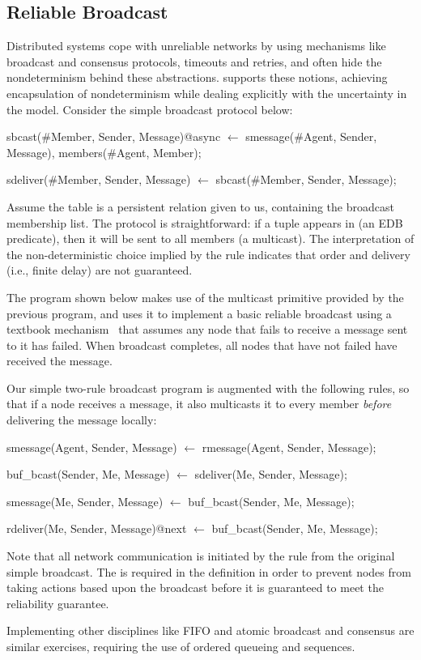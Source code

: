 \subsection{Reliable Broadcast}
Distributed systems cope with unreliable networks by using mechanisms like broadcast and consensus protocols, 
timeouts and retries, and often hide the nondeterminism behind these abstractions.  \lang supports these notions,
achieving encapsulation of nondeterminism while dealing explicitly with the uncertainty in the model.  Consider the simple
broadcast protocol below:

\begin{Dedalus}
sbcast(#Member, Sender, Message)@async \(\leftarrow\)
  smessage(#Agent, Sender, Message),
  members(#Agent, Member);

sdeliver(#Member, Sender, Message) \(\leftarrow\)
  sbcast(#Member, Sender, Message);
\end{Dedalus}

Assume the table  is a persistent relation given to us, containing the broadcast 
membership list.  
The protocol is straightforward: if a tuple appears in  (an EDB predicate), then
it will be sent to all members (a multicast).  The interpretation of the non-deterministic choice implied by the
 rule indicates that order and delivery (i.e., finite delay) are not guaranteed.

The program shown below makes use of the
multicast primitive provided by the previous program, and uses it
to implement a basic reliable broadcast using a textbook
mechanism~\cite{mullender} that assumes any node that fails to receive
a message sent to it has failed.  When broadcast completes, all nodes
that have not failed have received the message.

Our simple two-rule broadcast program is augmented with the following rules, so that if a node receives a message, it 
also multicasts it to every member \emph{before} delivering the message locally:

\begin{Dedalus}
smessage(Agent, Sender, Message)  \(\leftarrow\)
  rmessage(Agent, Sender, Message);

buf_bcast(Sender, Me, Message)  \(\leftarrow\)
  sdeliver(Me, Sender, Message);

smessage(Me, Sender, Message)  \(\leftarrow\)
  buf_bcast(Sender, Me, Message);

rdeliver(Me, Sender, Message)@next  \(\leftarrow\)
  buf_bcast(Sender, Me, Message);
\end{Dedalus}

Note that all network communication is initiated by the
 rule from the original simple broadcast.  The  is
required in the  definition in order to prevent nodes from
taking actions based upon the broadcast before it is guaranteed to
meet the reliability guarantee.

Implementing other disciplines like FIFO and atomic broadcast and
consensus are similar exercises, requiring the use of ordered queueing
and sequences.
